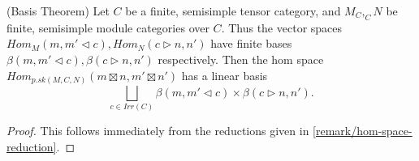 \begin{proposition} (Basis Theorem) \label{proposition/basis-theorem}
  \noindent Let $C$ be a finite, semisimple tensor category, and
  $M_{C}, _{C}N$ be finite, semisimple module categories over $C$. \quad Thus
  the vector spaces $Hom_{M}(m, m' \lhd c), Hom_{N}(c \rhd n, n')$ have finite bases
  $\beta(m, m' \lhd c), \beta(c \rhd n, n')$ respectively. \quad Then the hom space
  $Hom_{p.sk(M,C,N)}(m \boxtimes n, m' \boxtimes n')$ has a linear basis
  \[
    \bigsqcup_{c \in Irr(C)} \beta(m, m' \lhd c) \times \beta(c \rhd n, n').
  \]
\end{proposition}
\begin{proof}
  This follows immediately from the reductions given in \ref{remark/hom-space-reduction}.
\end{proof}

